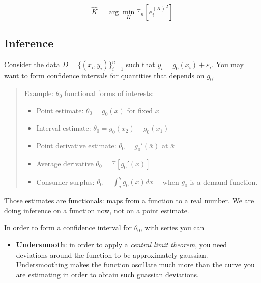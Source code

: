 \documentclass[12pt,]{book}
\providecommand{\tightlist}{%
  \setlength{\itemsep}{0pt}\setlength{\parskip}{0pt}}
\begin{document}
\[
  \hat{K} = \arg \min_K \mathbb E_n \left[ {e^{(K)}_i}^2 \right]
\]

\hypertarget{inference-2}{%
\subsection{Inference}\label{inference-2}}

Consider the data \(D = \{ (x_i, y_i) \}_{i=1}^n\) such that \(y_i = g_0 (x_i) + \varepsilon_i\). You may want to form confidence intervals for quantities that depends on \(g_0\).

\begin{quote}
Example: \(\theta_0\) functional forms of interests:

\begin{itemize}
\tightlist
\item
  Point estimate: \(\theta_0 = g_0 (\bar{x} )\) for fixed \(\bar{x}\)
\item
  Interval estimate: \(\theta_0 = g_0 (\bar{x}_2) - g_0 (\bar{x}_1)\)
\item
  Point derivative estimate: \(\theta_0 = g_0 ' (\bar{x})\) at \(\bar{x}\)
\item
  Average derivative \(\theta_0 = \mathbb E [g_0 ' (x) ]\)
\item
  Consumer surplus: \(\theta_0 = \int_a^b g_0(x)dx \quad\) when \(g_0\) is a demand function.
\end{itemize}
\end{quote}

Those estimates are functionals: maps from a function to a real number. We are doing inference on a function now, not on a point estimate.

In order to form a confidence interval for \(\theta_0\), with series you can

\begin{itemize}
\tightlist
\item
  \textbf{Undersmooth}: in order to apply a \textit{central limit theorem}, you need deviations around the function to be approximately gaussian. Undersmoothing makes the function oscillate much more than the curve you are estimating in order to obtain such guassian deviations.
\end{itemize}
\end{document}
